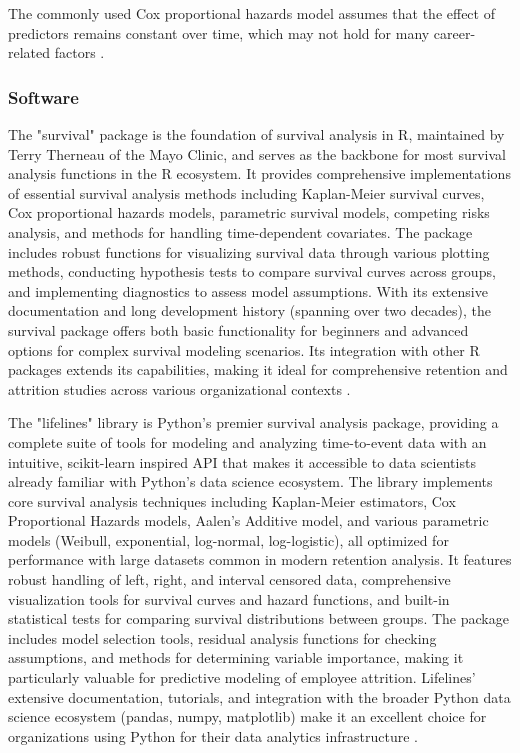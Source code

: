 \documentclass[../main.tex]{subfiles}
\begin{document}
The commonly used Cox proportional hazards model assumes that the effect of predictors remains constant over time, which may not hold for many career-related factors \parencite{limitations2016survival}.

\subsubsection{Software}

The "survival" package is the foundation of survival analysis in R, maintained by Terry Therneau of the Mayo Clinic, and serves as the backbone for most survival analysis functions in the R ecosystem. It provides comprehensive implementations of essential survival analysis methods including Kaplan-Meier survival curves, Cox proportional hazards models, parametric survival models, competing risks analysis, and methods for handling time-dependent covariates. The package includes robust functions for visualizing survival data through various plotting methods, conducting hypothesis tests to compare survival curves across groups, and implementing diagnostics to assess model assumptions. With its extensive documentation and long development history (spanning over two decades), the survival package offers both basic functionality for beginners and advanced options for complex survival modeling scenarios. Its integration with other R packages extends its capabilities, making it ideal for comprehensive retention and attrition studies across various organizational contexts \parencite{therneau2023survival}.

The "lifelines" library is Python's premier survival analysis package, providing a complete suite of tools for modeling and analyzing time-to-event data with an intuitive, scikit-learn inspired API that makes it accessible to data scientists already familiar with Python's data science ecosystem. The library implements core survival analysis techniques including Kaplan-Meier estimators, Cox Proportional Hazards models, Aalen's Additive model, and various parametric models (Weibull, exponential, log-normal, log-logistic), all optimized for performance with large datasets common in modern retention analysis. It features robust handling of left, right, and interval censored data, comprehensive visualization tools for survival curves and hazard functions, and built-in statistical tests for comparing survival distributions between groups. The package includes model selection tools, residual analysis functions for checking assumptions, and methods for determining variable importance, making it particularly valuable for predictive modeling of employee attrition. Lifelines' extensive documentation, tutorials, and integration with the broader Python data science ecosystem (pandas, numpy, matplotlib) make it an excellent choice for organizations using Python for their data analytics infrastructure \parencite{lifelines2023documentation}.
\end{document}
